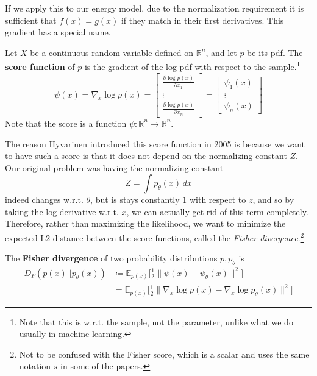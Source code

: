 \documentclass{article}
\begin{document}
    If we apply this to our energy model, due to the normalization requirement it is sufficient that $f(x) = g(x)$ if they match in their first derivatives. This gradient has a special name. 

    \begin{definition}[Score]
      \label{def:score}
      Let $X$ be a \hyperref[prob-def:continuous-random-variable]{continuous random variable} defined on $\mathbb{R}^n$, and let $p$ be its pdf. The \textbf{score function} of $p$ is the gradient of the log-pdf with respect to the sample.\footnote{Note that this is w.r.t. the sample, not the parameter, unlike what we do usually in machine learning.}
      \begin{equation}
        \psi (x) = \nabla_x \log p(x) = \begin{bmatrix} \frac{\partial \log{p(x)}}{\partial x_1} \\ \vdots \\ \frac{\partial \log{p(x)}}{\partial x_n} \end{bmatrix} =  
        \begin{bmatrix}
          \psi_1 (x) \\ \vdots \\ \psi_n (x)
        \end{bmatrix} 
      \end{equation}
      Note that the score is a function $\psi: \mathbb{R}^n \rightarrow \mathbb{R}^n$. 
    \end{definition} 

    The reason Hyvarinen introduced this score function in 2005 is because we want to have such a score is that it does not depend on the normalizing constant $Z$. Our original problem was having the normalizing constant 
    \begin{equation}
      Z = \int p_\theta (x) \,dx
    \end{equation} 
    indeed changes w.r.t. $\theta$, but is stays constantly $1$ with respect to $z$, and so by taking the log-derivative w.r.t. $x$, we can actually get rid of this term completely. \cite{orig_score} Therefore, rather than maximizing the likelihood, we want to minimize the expected L2 distance between the score functions, called the \textit{Fisher divergence}.\footnote{Not to be confused with the Fisher score, which is a scalar and uses the same notation $s$ in some of the papers.} 

    \begin{definition}
      \label{def:fisher-divergence}
      The \textbf{Fisher divergence} of two probability distributions $p, p_\theta$ is 
      \begin{align}
        D_F (p(x) || p_\theta (x)) & \coloneqq \mathbb{E}_{p(x)} \bigg[ \frac{1}{2} \| \psi(x) - \psi_\theta(x) \|^2 \bigg] \\
                                   & = \mathbb{E}_{p(x)} \bigg[ \frac{1}{2} \| \nabla_x \log p(x) - \nabla_x \log p_\theta (x) \|^2 \bigg]
      \end{align}
    \end{definition} 
\end{document}
